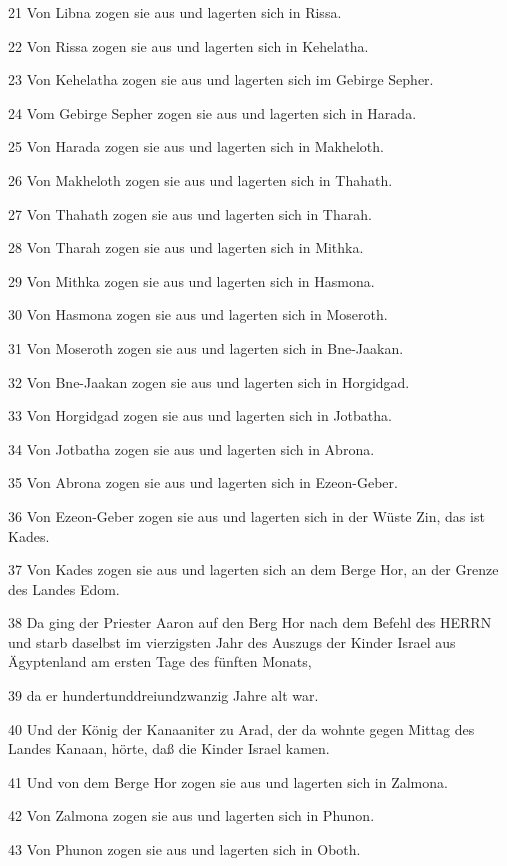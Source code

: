 \par 21 Von Libna zogen sie aus und lagerten sich in Rissa.
\par 22 Von Rissa zogen sie aus und lagerten sich in Kehelatha.
\par 23 Von Kehelatha zogen sie aus und lagerten sich im Gebirge Sepher.
\par 24 Vom Gebirge Sepher zogen sie aus und lagerten sich in Harada.
\par 25 Von Harada zogen sie aus und lagerten sich in Makheloth.
\par 26 Von Makheloth zogen sie aus und lagerten sich in Thahath.
\par 27 Von Thahath zogen sie aus und lagerten sich in Tharah.
\par 28 Von Tharah zogen sie aus und lagerten sich in Mithka.
\par 29 Von Mithka zogen sie aus und lagerten sich in Hasmona.
\par 30 Von Hasmona zogen sie aus und lagerten sich in Moseroth.
\par 31 Von Moseroth zogen sie aus und lagerten sich in Bne-Jaakan.
\par 32 Von Bne-Jaakan zogen sie aus und lagerten sich in Horgidgad.
\par 33 Von Horgidgad zogen sie aus und lagerten sich in Jotbatha.
\par 34 Von Jotbatha zogen sie aus und lagerten sich in Abrona.
\par 35 Von Abrona zogen sie aus und lagerten sich in Ezeon-Geber.
\par 36 Von Ezeon-Geber zogen sie aus und lagerten sich in der Wüste Zin, das ist Kades.
\par 37 Von Kades zogen sie aus und lagerten sich an dem Berge Hor, an der Grenze des Landes Edom.
\par 38 Da ging der Priester Aaron auf den Berg Hor nach dem Befehl des HERRN und starb daselbst im vierzigsten Jahr des Auszugs der Kinder Israel aus Ägyptenland am ersten Tage des fünften Monats,
\par 39 da er hundertunddreiundzwanzig Jahre alt war.
\par 40 Und der König der Kanaaniter zu Arad, der da wohnte gegen Mittag des Landes Kanaan, hörte, daß die Kinder Israel kamen.
\par 41 Und von dem Berge Hor zogen sie aus und lagerten sich in Zalmona.
\par 42 Von Zalmona zogen sie aus und lagerten sich in Phunon.
\par 43 Von Phunon zogen sie aus und lagerten sich in Oboth.
